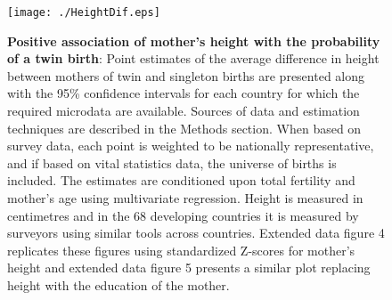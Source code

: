 \documentclass{nature}
\begin{document}
\begin{linenumbers}

\clearpage
\thispagestyle{empty}

\clearpage

\begin{spacing}{1}
\begin{figure}[htpb!]
  \texttt{[image: ./HeightDif.eps]}
\vspace{5mm}
\caption{\textbf{Positive association of mother's height with the probability of a twin birth}: {\footnotesize Point estimates of the average difference in height between mothers of twin and singleton births are presented along with the 95\% confidence intervals for each country for which the required microdata are available. Sources of data and estimation techniques are described in the Methods section. When based on survey data, each point is weighted to be nationally representative, and if based on vital statistics data, the universe of births is included. The estimates are conditioned upon total fertility and mother's age using multivariate regression. Height is measured in centimetres and in the 68 developing countries it is measured by surveyors using similar tools across countries. Extended data figure 4 replicates these figures using standardized Z-scores for mother's height and extended data figure 5 presents a similar plot replacing height with the education of the mother.}}
\label{fig:countryEsts}
\end{figure}



\end{spacing}
\end{linenumbers}
\end{document}
